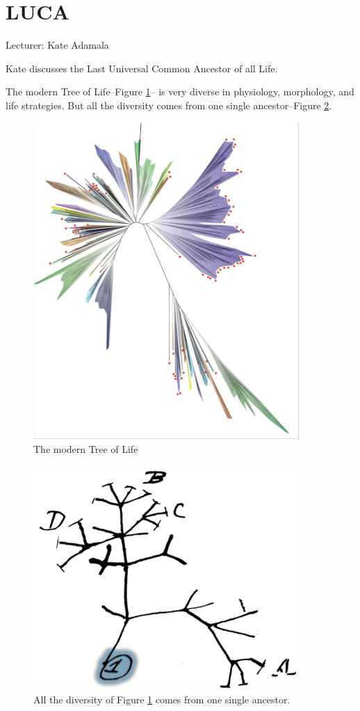 \documentclass[]{article}
\begin{document}
\section{LUCA}

Lecturer: Kate Adamala

Kate discusses the Last Universal Common Ancestor of all Life.

The modern Tree of Life--Figure \ref{fig:TOL4}-- is very diverse in physiology, morphology, and life strategies. But all the diversity  comes from one single ancestor--Figure \ref{fig:TOL_root}.
\begin{figure}[H]
	\caption{The modern Tree of Life}\label{fig:TOL4}
	\includegraphics[width=0.9\textwidth]{TOL4}
\end{figure}

\begin{figure}[H]
	\caption{All the diversity of Figure \ref{fig:TOL4} comes from one single ancestor.}\label{fig:TOL_root}
	\includegraphics[width=0.9\textwidth]{TOL_root}
\end{figure}
\end{document}
